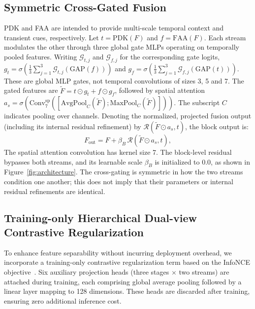 \documentclass[jec]{acnsart}
\begin{document}
\subsection{Symmetric Cross-Gated Fusion}
\label{sec:fusion}
PDK and FAA are intended to provide multi-scale temporal context and transient cues, respectively. Let $t=\mathrm{PDK}(F)$ and $f=\mathrm{FAA}(F)$. Each stream modulates the other through three global gate MLPs operating on temporally pooled features. Writing $\mathcal G_{t,j}$ and $\mathcal G_{f,j}$ for the corresponding gate logits, $g_t=\sigma(\frac{1}{3}\sum_{j=1}^{3}\mathcal G_{t,j}(\mathrm{GAP}(f)))$ and $g_f=\sigma(\frac{1}{3}\sum_{j=1}^{3}\mathcal G_{f,j}(\mathrm{GAP}(t)))$. These are global MLP gates, not temporal convolutions of sizes 3, 5 and 7. The gated features are $\tilde F=t\odot g_t+f\odot g_f$, followed by spatial attention $a_s=\sigma(\mathrm{Conv}^{\mathrm{sp}}_7([\mathrm{AvgPool}_C(\tilde F);\mathrm{MaxPool}_C(\tilde F)]))$. The subscript $C$ indicates pooling over channels. Denoting the normalized, projected fusion output (including its internal residual refinement) by $\mathcal R(\tilde F\odot a_s,t)$, the block output is:
\begin{equation}
\label{eq:fusion}
F_{\mathrm{out}}=F+\beta_B\,\mathcal R(\tilde F\odot a_s,t),
\end{equation}
The spatial attention convolution has kernel size 7. The block-level residual bypasses both streams, and its learnable scale $\beta_B$ is initialized to 0.0, as shown in Figure~\ref{fig:architecture}. The cross-gating is symmetric in how the two streams condition one another; this does not imply that their parameters or internal residual refinements are identical.


\subsection{Training-only Hierarchical Dual-view Contrastive Regularization}
\label{subsec:contrastive_learning}
To enhance feature separability without incurring deployment overhead, we incorporate a training-only contrastive regularization term based on the InfoNCE objective~\cite{chen2020simclr,Zhang2022TFC}. Six auxiliary projection heads (three stages $\times$ two streams) are attached during training, each comprising global average pooling followed by a linear layer mapping to 128 dimensions. These heads are discarded after training, ensuring zero additional inference cost.
\end{document}
